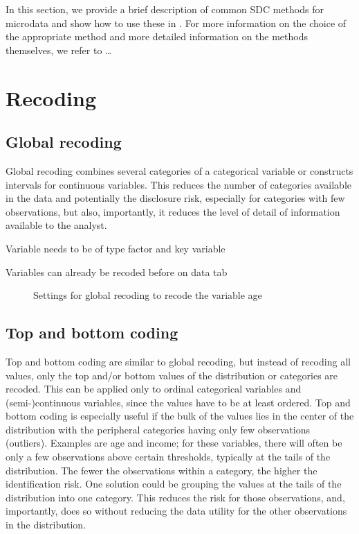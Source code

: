 \documentclass[letterpaper,10pt,english]{sphinxmanual}
\begin{document}
In this section, we provide a brief description of common SDC methods for microdata and
show how to use these in . For more information on the choice of the
appropriate method and more detailed information on the methods themselves, we refer to …


\section{Recoding}
\label{\detokenize{anon:recoding}}

\subsection{Global recoding}
\label{\detokenize{anon:global-recoding}}
Global recoding combines several categories of a categorical variable or constructs
intervals for continuous variables. This reduces the number of categories available
in the data and potentially the disclosure risk, especially for categories with few
observations, but also, importantly, it reduces the level of detail of information
available to the analyst.

Variable needs to be of type factor and key variable

Variables can already be recoded before on data tab

\begin{figure}[htbp]
\centering
\capstart

\noindent{}
\caption{Settings for global recoding to recode the variable age}\label{\detokenize{anon:fig81}}\label{\detokenize{anon:id1}}\end{figure}


\subsection{Top and bottom coding}
\label{\detokenize{anon:top-and-bottom-coding}}
Top and bottom coding are similar to global recoding, but instead of recoding all values,
only the top and/or bottom values of the distribution or categories are recoded. This can
be applied only to ordinal categorical variables and (semi-)continuous variables, since
the values have to be at least ordered. Top and bottom coding is especially useful if
the bulk of the values lies in the center of the distribution with the peripheral
categories having only few observations (outliers). Examples are age and income; for
these variables, there will often be only a few observations above certain thresholds,
typically at the tails of the distribution. The fewer the observations within a category,
the higher the identification risk. One solution could be grouping the values at the tails
of the distribution into one category. This reduces the risk for those observations, and,
importantly, does so without reducing the data utility for the other observations in the
distribution.
\end{document}
